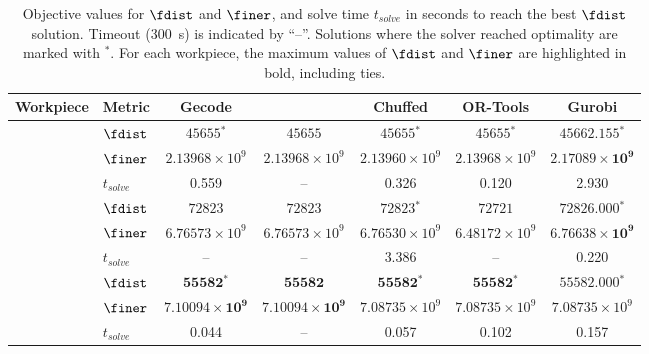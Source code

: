 \begin{table}[!b]
	\centering
	\footnotesize
	\caption{Objective values for $\fdist$ and $\finer$, and solve time $t_{solve}$ in seconds to reach the best $\fdist$ solution. Timeout (300~s) is indicated by ``--''. Solutions where the solver reached optimality are marked with $^*$. For each workpiece, the maximum values of $\fdist$ and $\finer$ are highlighted in bold, including ties.}
	\label{tab:objective_runtime}
	\setlength{\tabcolsep}{2pt}
	\begin{tabular}{llccccc}
		\toprule
		Workpiece & Metric & Gecode & \lns & Chuffed & OR-Tools & Gurobi \\
		\midrule

		 & $\fdist$ & $45655{}^*$ & $45655$ & $45655{}^*$ & $45655{}^*$ & $\mathbf{45662.155{}^*}$ \\
        & $\finer$ & $2.13968\times 10^{9}$ & $2.13968\times 10^{9}$ & $2.13960\times 10^{9}$ & $2.13968\times 10^{9}$ & $\mathbf{2.17089\times 10^{9}}$ \\
		& $t_{solve}$ & 0.559 & -- & 0.326 & 0.120 & 2.930 \\
		\midrule

		 & $\fdist$ & $72823$ & $72823$ & $72823{}^*$ & $72721$ & $\mathbf{72826.000{}^*}$ \\
        & $\finer$ & $6.76573\times 10^{9}$ & $6.76573\times 10^{9}$ & $6.76530\times 10^{9}$ & $6.48172\times 10^{9}$ & $\mathbf{6.76638\times 10^{9}}$ \\
		& $t_{solve}$ & -- & -- & 3.386 & -- & 0.220 \\
		\midrule

		 & $\fdist$ & $\mathbf{55582{}^*}$ & $\mathbf{55582}$ & $\mathbf{55582{}^*}$ & $\mathbf{55582{}^*}$ & $\mathbf{55582.000{}^*}$ \\
        & $\finer$ & $\mathbf{7.10094\times 10^{9}}$ & $\mathbf{7.10094\times 10^{9}}$ & $7.08735\times 10^{9}$ & $7.08735\times 10^{9}$ & $7.08735\times 10^{9}$ \\
		& $t_{solve}$ & 0.044 & -- & 0.057 & 0.102 & 0.157 \\
		\midrule


\end{tabular}
\end{table}
